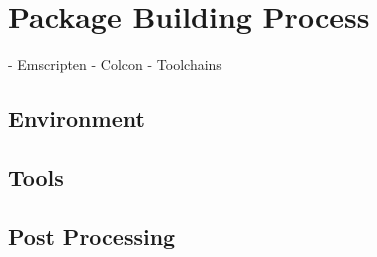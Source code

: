 \chapter{Package Building Process}\label{cha:build}

- Emscripten
- Colcon
- Toolchains

\section{Environment}


\section{Tools}


\section{Post Processing}
